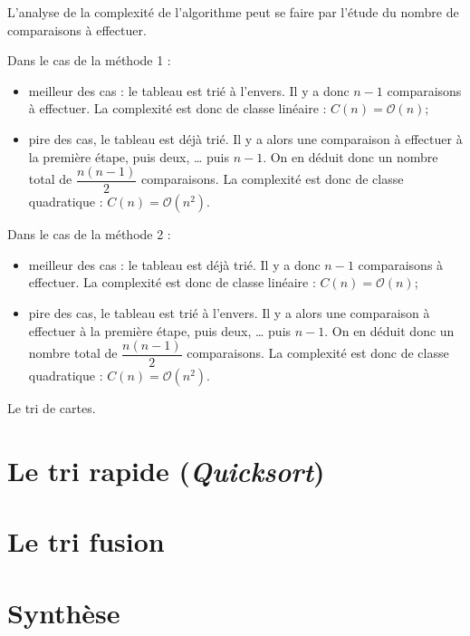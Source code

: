 \documentclass[10pt,fleqn]{article} %
\begin{document}
L’analyse de la complexité de l’algorithme peut se faire par l’étude du nombre de comparaisons à effectuer.

Dans le cas de la méthode 1 : 
\begin{itemize}
\item meilleur des cas : le tableau est trié à l’envers. Il y a donc $n - 1$ comparaisons à effectuer. La complexité est donc de classe linéaire : $C(n)=\mathcal{O}(n)$;
\item pire des cas, le tableau est déjà trié. Il y a alors une comparaison à effectuer à la première étape, puis deux, … puis $n-1$. On en déduit donc un nombre total de $\dfrac{n\left(n-1\right)}{2}$ comparaisons. La complexité est donc de classe quadratique : $C(n)=\mathcal{O}\left(n^2\right)$.
\end{itemize}

Dans le cas de la méthode 2 : 
\begin{itemize}
\item meilleur des cas : le tableau est déjà trié. Il y a donc $n - 1$ comparaisons à effectuer. La complexité est donc de classe linéaire : $C(n)=\mathcal{O}(n)$;
\item pire des cas, le tableau est trié à l’envers. Il y a alors une comparaison à effectuer à la première étape, puis deux, … puis $n-1$. On en déduit donc un nombre total de $\dfrac{n\left(n-1\right)}{2}$  comparaisons. La complexité est donc de classe quadratique : $C(n)=\mathcal{O}\left(n^2\right)$.


\end{itemize}


\begin{exemple}
Le tri de cartes.
\end{exemple}

\section{Le tri rapide (\textit{Quicksort})}

\section{Le tri fusion}

\section{Synthèse}

\begin{thebibliography}{2}

\end{thebibliography}
\end{document}
